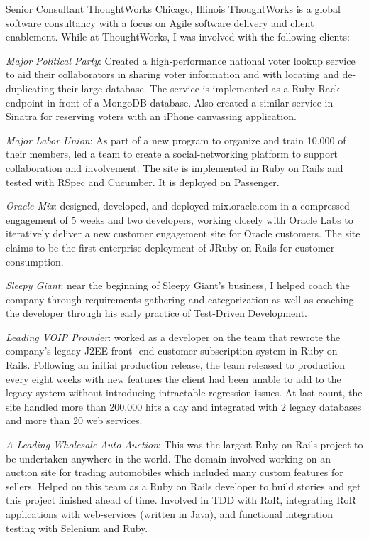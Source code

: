 \documentclass[11pt,letterpaper]{moderncv}
\begin{document}
 {Senior Consultant} {ThoughtWorks} {Chicago, Illinois} {} {%
  ThoughtWorks is a global software consultancy with a focus on Agile software
  delivery and client enablement. While at ThoughtWorks, I was involved with
  the following clients:}
\begin{list}{}{
    \normalfont
    \small
    \setlength{\leftmargin}{3.2cm}
    \setlength{\topsep}{0cm}
    \setlength{\itemsep}{0cm}
    \setlength{\parsep}{0cm}}
\item \emph{Major Political Party}: Created a high-performance national
  voter lookup service to aid their collaborators in sharing voter
  information and with locating and de-duplicating their large
  database. The service is implemented as a Ruby Rack endpoint in
  front of a MongoDB database. Also created a similar service in
  Sinatra for reserving voters with an iPhone canvassing application.
\item \emph{Major Labor Union}: As part of a new program to organize
  and train 10,000 of their members, led a team to create a
  social-networking platform to support collaboration and involvement.
  The site is implemented in Ruby on Rails and tested with RSpec and
  Cucumber. It is deployed on Passenger.
\item \emph{Oracle Mix}: designed, developed, and deployed
  mix.oracle.com in a compressed engagement of 5 weeks and two
  developers, working closely with Oracle Labs to iteratively deliver
  a new customer engagement site for Oracle customers. The site claims
  to be the first enterprise deployment of JRuby on Rails for customer
  consumption.
\item \emph{Sleepy Giant}: near the beginning of Sleepy Giant's
  business, I helped coach the company through requirements gathering
  and categorization as well as coaching the developer through his
  early practice of Test-Driven Development.
\item \emph{Leading VOIP Provider}: worked as a developer on the team
  that rewrote the company's legacy J2EE front- end customer
  subscription system in Ruby on Rails. Following an initial
  production release, the team released to production every eight
  weeks with new features the client had been unable to add to the
  legacy system without introducing intractable regression issues. At
  last count, the site handled more than 200,000 hits a day and
  integrated with 2 legacy databases and more than 20 web services.
\item \emph{A Leading Wholesale Auto Auction}: This was the largest
  Ruby on Rails project to be undertaken anywhere in the world. The
  domain involved working on an auction site for trading automobiles
  which included many custom features for sellers. Helped on this team
  as a Ruby on Rails developer to build stories and get this project
  finished ahead of time. Involved in TDD with RoR, integrating RoR
  applications with web-services (written in Java), and functional
  integration testing with Selenium and Ruby.
\end{list}
\end{document}
